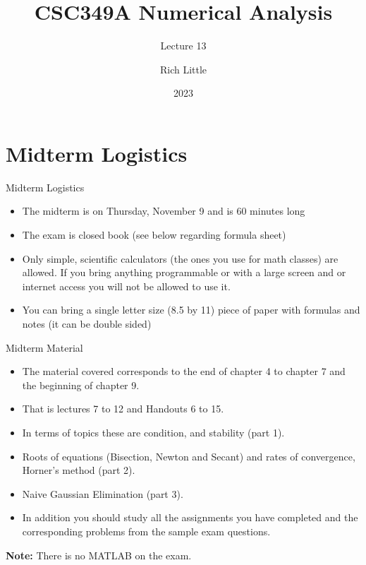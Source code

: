 \documentclass[12pt]{beamer}
\title[CSC349A Numerical Analysis]{CSC349A Numerical Analysis}
\subtitle[Lecture 13]{Lecture 13}
\date[2023]{2023}
\author[R. Little]{Rich Little}
\institute[University of Victoria]{University of Victoria}
\begin{document}
\frame{\maketitle} %



\section{Midterm Logistics}

\begin{frame}{Midterm Logistics}
\begin{itemize} 

\item The midterm is on Thursday, November 9 and is 60 minutes long 

\item The exam is closed book (see below regarding formula sheet)

\item Only simple, scientific calculators (the ones you use for math classes) are allowed. If you bring anything programmable or with a large screen and or internet access you will not be allowed to use it.

\item You can bring a single letter size (8.5 by 11) piece of paper with formulas and notes (it can be double sided)
\end{itemize} 

\end{frame} 


\begin{frame}{Midterm Material} 
\begin{itemize}

\item{The material covered corresponds to the end of chapter 4 to chapter 7 and the beginning of chapter 9.}
\item{That is lectures 7 to 12 and Handouts 6 to 15.} 
\item{In terms of topics these are condition, and stability (part 1).}
\item{Roots of equations (Bisection, Newton and Secant) and rates of convergence, Horner's method (part 2).} 
\item{Naive Gaussian Elimination (part 3).} 
\item{In addition you should study all the assignments
you have completed and the corresponding problems from the sample exam
questions.}

\end{itemize}

{\bf Note:} There is no MATLAB on the exam.

\end{frame} 
\end{document}
